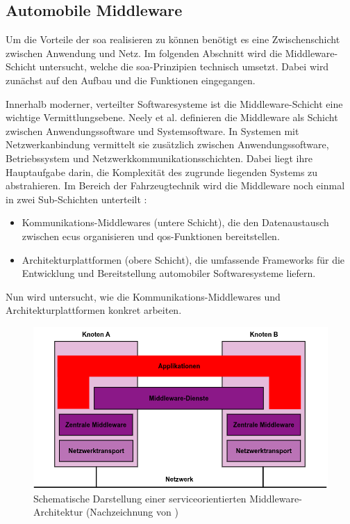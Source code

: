 \subsection{Automobile Middleware}
\label{subsect:middle}

Um die Vorteile der \gls{soa} realisieren zu können benötigt es eine Zwischenschicht zwischen Anwendung und Netz. Im folgenden Abschnitt wird die Middleware-Schicht untersucht, welche die \gls{soa}-Prinzipien technisch umsetzt. Dabei wird zunächst auf den Aufbau und die Funktionen eingegangen.


Innerhalb moderner, verteilter Softwaresysteme ist die Middleware-Schicht eine wichtige Vermittlungsebene. Neely et al. \cite{neely2006adaptive} definieren die Middleware als Schicht zwischen Anwendungssoftware und Systemsoftware. In Systemen mit Netzwerkanbindung vermittelt sie zusätzlich zwischen Anwendungssoftware, Betriebssystem und Netzwerkkommunikationsschichten. Dabei liegt ihre Hauptaufgabe darin, die Komplexität des zugrunde liegenden Systems zu abstrahieren. Im Bereich der Fahrzeugtechnik wird die Middleware noch einmal in zwei Sub-Schichten unterteilt \cite{kluner2024moderna}:
\begin{itemize}
  \item Kommunikations-Middlewares (untere Schicht), die den Datenaustausch zwischen \glspl{ecu} organisieren und \gls{qos}-Funktionen bereitstellen.
  \item Architekturplattformen (obere Schicht), die umfassende Frameworks für die Entwicklung und Bereitstellung automobiler Softwaresysteme liefern.
\end{itemize}
Nun wird untersucht, wie die Kommunikations-Middlewares und Architekturplattformen konkret arbeiten.

\begin{figure}[h!]
  \centering
  \includegraphics[width=\textwidth]{figures/02Grundlagen/Middleware_Scheme.drawio.png}
  \caption{Schematische Darstellung einer serviceorientierten Middleware-Architektur (Nachzeichnung von \cite{neely2006adaptive})}
  \label{fig:middleware}
\end{figure}

